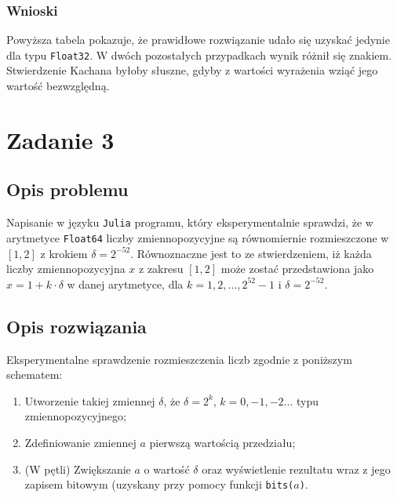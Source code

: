 \documentclass{classrep}
\begin{document}
	\subsubsection{Wnioski}
		Powyższa tabela pokazuje, że prawidłowe rozwiązanie udało się uzyskać jedynie dla typu 
		\texttt{Float32}. W dwóch pozostałych przypadkach wynik różnił się znakiem. Stwierdzenie Kachana
		byłoby słuszne, gdyby z wartości wyrażenia wziąć jego wartość bezwzględną.
\section{Zadanie 3}
	\subsection{Opis problemu}
		Napisanie w języku \texttt{Julia} programu, który eksperymentalnie sprawdzi, że w arytmetyce 
		\texttt{Float64} liczby zmiennopozycyjne są równomiernie rozmieszczone w $[1,2]$ z krokiem $\delta = 
		2^{-52}$. Równoznaczne jest to ze stwierdzeniem, iż każda liczby zmiennopozycyjna $x$ z zakresu 
		$[1,2]$ może zostać przedstawiona jako $x = 1 + k \cdot \delta$ w danej arytmetyce, dla 
		$k = 1,2,\dots,2^{52}-1$ i $\delta = 2^{-52}$.
	\subsection{Opis rozwiązania}
		Eksperymentalne sprawdzenie rozmieszczenia liczb zgodnie z poniższym schematem:
		\begin{enumerate}
			\item Utworzenie takiej zmiennej $\delta$, że $\delta = 2^{k}$, $k = 0,-1,-2\dots $ typu 
			zmiennopozycyjnego;
			\item Zdefiniowanie zmiennej $a$ pierwszą wartością przedziału;
			\item (W pętli) Zwiększanie $a$ o wartość $\delta$ oraz wyświetlenie rezultatu
			wraz z jego zapisem bitowym (uzyskany przy pomocy funkcji \texttt{bits($a$)}.
		\end{enumerate}
\end{document}

